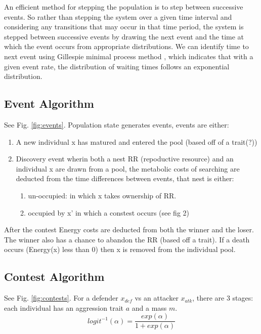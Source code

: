 \documentclass[a4paper,11pt]{article}
\begin{document}
An efficient method for stepping the population is to step between successive events. So rather than stepping the system over a given time interval and considering any transitions that may occur in that time period, the system is stepped between successive events by drawing the next event and the time at which the event occurs from appropriate distributions.  We can identify time to next event using Gillespie minimal process method \citep{Gillespie-1976}, which indicates that with a given event rate, the distribution of waiting times follows an exponential distribution.

\subsection{Event Algorithm}
See Fig. \ref{fig:events}. Population state generates events, events are either:
\begin{enumerate}
    \item A new individual x has matured and entered the pool (based off of a trait(?))
    \item Discovery event wherin both a nest RR (repoductive resource) and an individual x are drawn from a pool, the metabolic costs of searching are deducted from the time differences between events, that nest is either:
    \begin{enumerate}
        \item un-occupied: in which x takes ownership of RR.
        \item occupied by x' in which a constest occurs (see fig 2)
    \end{enumerate}
\end{enumerate}
After the contest Energy costs are deducted from both the winner and the loser.
The winner also has a chance to abandon the RR (based off a trait).
If a death occurs (Energy(x) less than 0) then x is removed from the individual pool.

\subsection{Contest Algorithm}
See Fig. \ref{fig:contests}.
For a defender $x_{def}$ vs an attacker $x_{atk}$, there are 3 stages:
each individual has an aggression trait $a$ and a mass $m$.
\begin{equation}\label{eq:logit}
    logit^{-1}(\alpha) = \frac{exp(\alpha)}{1 + exp(\alpha)}
\end{equation}
\end{document}
